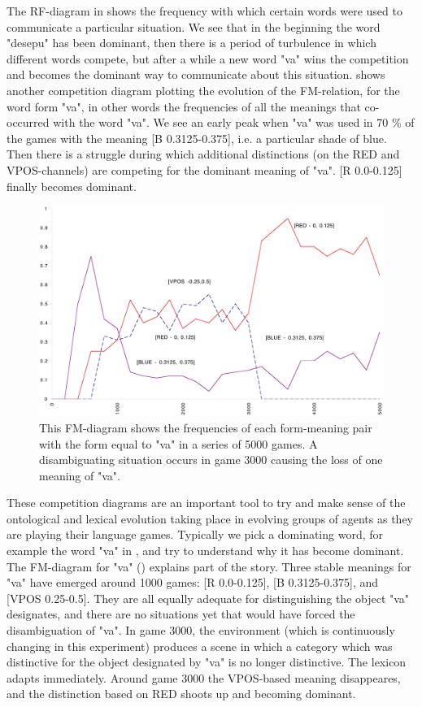 The RF-diagram in  shows the 
frequency with which certain words were used to communicate 
a particular situation. We see that in
the beginning the word "desepu" has been dominant, then 
there is a period of turbulence in which different 
words compete, but after a while a new word "va" wins 
the competition and becomes the dominant way to communicate 
about this situation.  shows another
competition diagram plotting the evolution of the FM-relation, for 
the word form "va", in other words the frequencies of 
all the meanings that co-occurred with the word "va". 
We see an early peak when "va" was used in 70 \% of the 
games with the meaning [B 0.3125-0.375], i.e. a particular
shade of blue. Then there is a struggle during which additional
distinctions (on the RED and VPOS-channels) are competing
for the dominant meaning of "va". 
[R 0.0-0.125] finally becomes dominant. 
\begin{figure}[htbp]
  \centerline{\includegraphics[width=.80\textwidth]{chap7/figs/fm}}
\caption{ \label{FM-diagram} This FM-diagram shows
the frequencies of each form-meaning pair with 
the form equal to "va" in a series of 5000 games.
A disambiguating situation occurs in game 3000
causing the loss of one meaning of "va".}
\end{figure}

These competition diagrams are an important tool to try 
and make sense of the ontological and lexical evolution
taking place in evolving groups of agents as they are
playing their language games. Typically we pick
a dominating word, for example the word "va" in 
, and try to understand
why it has become dominant. 
The FM-diagram for "va" () explains
part of the story. Three stable meanings for "va" have emerged
around 1000 games: 
[R 0.0-0.125], [B 0.3125-0.375], and [VPOS 0.25-0.5]. 
They are all equally adequate for distinguishing the object
"va" designates, and there are no situations yet
that would have forced the disambiguation of "va". 
In game 3000, the environment (which is continuously 
changing in this experiment) produces a scene in which
a category which was distinctive for the object designated by 
"va" is no longer distinctive. The lexicon adapts 
immediately. Around game 3000 the VPOS-based meaning disappeares, 
and the distinction based on RED shoots up and becoming dominant. 

